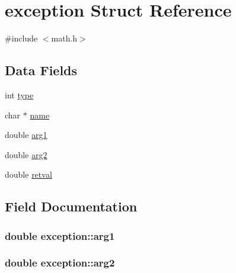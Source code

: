 \hypertarget{structexception}{}\section{exception Struct Reference}
\label{structexception}


{\ttfamily \#include $<$math.\+h$>$}

\subsection*{Data Fields}
\begin{DoxyCompactItemize}
\item 
int \hyperlink{structexception_a87f4034c8d562b108c9f6a30c7c54733}{type}
\item 
char $\ast$ \hyperlink{structexception_a1faeda487816f36cc9f39eec454bcf28}{name}
\item 
double \hyperlink{structexception_a96cbf8c497d14d54a4ac98533b24b6b6}{arg1}
\item 
double \hyperlink{structexception_afe3a646ecf91dbf9496ac2ce28a84f03}{arg2}
\item 
double \hyperlink{structexception_a3b9cb600557fbf2b86e7ea18861dc1bb}{retval}
\end{DoxyCompactItemize}


\subsection{Field Documentation}
\hypertarget{structexception_a96cbf8c497d14d54a4ac98533b24b6b6}{}
\subsubsection[{arg1}]{\setlength{\rightskip}{0pt plus 5cm}double exception\+::arg1}\label{structexception_a96cbf8c497d14d54a4ac98533b24b6b6}
\hypertarget{structexception_afe3a646ecf91dbf9496ac2ce28a84f03}{}
\subsubsection[{arg2}]{\setlength{\rightskip}{0pt plus 5cm}double exception\+::arg2}\label{structexception_afe3a646ecf91dbf9496ac2ce28a84f03}
\hypertarget{structexception_a1faeda487816f36cc9f39eec454bcf28}{}
